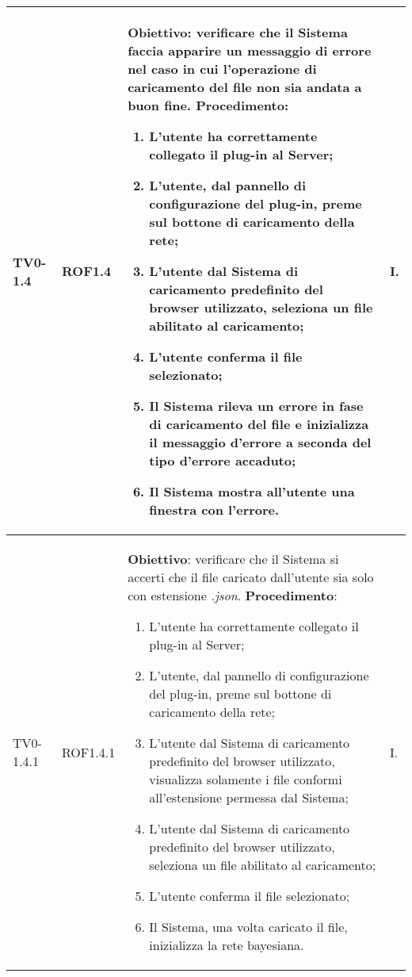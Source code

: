 \begin{longtable}{|C{.15\textwidth}|C{.13\textwidth}|m{.52\textwidth}|C{.08\textwidth}|}
TV0-1.4 & ROF1.4 &
	\textbf{Obiettivo}: verificare che il Sistema faccia apparire un messaggio di errore nel caso in cui l'operazione di caricamento del file non sia andata a buon fine. \newline
	\textbf{Procedimento}:
	\begin{enumerate}
		\item L'utente ha correttamente collegato il plug-in al Server;
		\item L'utente, dal pannello di configurazione del plug-in, preme sul bottone di caricamento della rete;
		\item L'utente dal Sistema di caricamento predefinito del browser utilizzato, seleziona un file abilitato al caricamento;
		\item L'utente conferma il file selezionato;
		\item Il Sistema rileva un errore in fase di caricamento del file e inizializza il messaggio d'errore a seconda del tipo d'errore accaduto;
		\item Il Sistema mostra all'utente una finestra con l'errore.
	\end{enumerate}
	& I. \\
\hline

 TV0-1.4.1 & ROF1.4.1 &
	\textbf{Obiettivo}: verificare che il Sistema si accerti che il file caricato dall'utente sia solo con estensione \textit{.json}. \newline
	\textbf{Procedimento}:
	\begin{enumerate}
		\item L'utente ha correttamente collegato il plug-in al Server;
		\item L'utente, dal pannello di configurazione del plug-in, preme sul bottone di caricamento della rete;
		\item L'utente dal Sistema di caricamento predefinito del browser utilizzato, visualizza solamente i file conformi all'estensione permessa dal Sistema;
		\item L'utente dal Sistema di caricamento predefinito del browser utilizzato, seleziona un file abilitato al caricamento;
		\item L'utente conferma il file selezionato;
		\item Il Sistema, una volta caricato il file, inizializza la rete bayesiana.
	\end{enumerate}
	& I. \\
\hline


\end{longtable}
